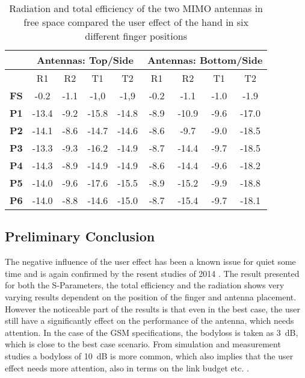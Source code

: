 \begin{table}[]
\centering
\begin{tabular}{|c|c|c|c|c|c|c|c|c|}
\hline
            & \multicolumn{4}{c|}{\textbf{Antennas: Top/Side}} & \multicolumn{4}{c|}{\textbf{Antennas: Bottom/Side}} \\ \hline
            & R1         & R2        & T1         & T2         & R1         & R2          & T1         & T2          \\ \hline
\textbf{FS} & -0.2       & -1.1      & -1,0       & -1,9       & -0.2       & -1.1        & -1.0       & -1.9        \\ \hline
\textbf{P1} & -13.4      & -9.2      & -15.8      & -14.8      & -8.9       & -10.9       & -9.6       & -17.0       \\ \hline
\textbf{P2} & -14.1      & -8.6      & -14.7      & -14.6      & -8.6       & -9.7        & -9.0       & -18.5       \\ \hline
\textbf{P3} & -13.3      & -9.3      & -16.2      & -14.9      & -8.7       & -14.4       & -9.7       & -18.5       \\ \hline
\textbf{P4} & -14.3      & -8.9      & -14.9      & -14.9      & -8.6       & -14.4       & -9.6       & -18.2       \\ \hline
\textbf{P5} & -14.0      & -9.6      & -17.6      & -15.5      & -8.9       & -15.2       & -9.9       & -18.8       \\ \hline
\textbf{P6} & -14.0      & -8.8      & -14.6      & -15.0      & -8.7       & -15.4       & -9.7       & -18.1       \\ \hline
\end{tabular}
\caption{Radiation and total efficiency of the two MIMO antennas in free space compared the user effect of the hand in six different finger positions \cite{Samantha2014UserEff}}
\label{tab:usereff_radeff}
\end{table}

\subsection{Preliminary Conclusion}
The negative influence of the user effect has been a known issue for quiet some time and is again confirmed by the resent studies of 2014 \cite{Samantha2014UserEff}. The result presented for both the S-Parameters, the total efficiency and the radiation shows very varying results dependent on the position of the finger and antenna placement. However the noticeable part of the results is that even in the best case, the user still have a significantly effect on the performance of the antenna, which needs attention. In the case of the GSM specifications, the bodyloss is taken as \SI{3}{dB}, which is close to the best case scenario. From simulation and measurement studies a bodyloss of \SI{10}{dB} is more common, which also implies that the user effect needs more attention, also in terms on the link budget etc. \cite{sanchez2008multiband}.
